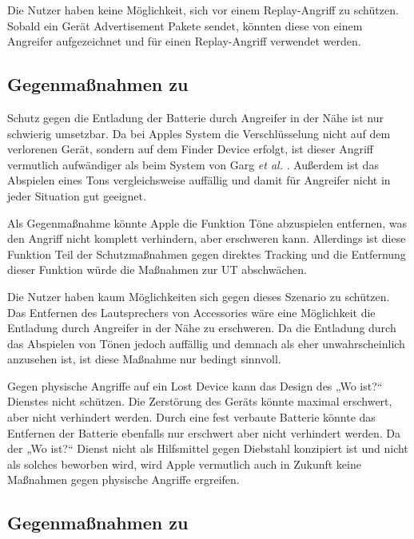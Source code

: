 Die Nutzer haben keine Möglichkeit, sich vor einem Replay-Angriff zu schützen.
Sobald ein Gerät Advertisement Pakete sendet, könnten diese von einem Angreifer aufgezeichnet und für einen Replay-Angriff verwendet werden.


\subsection{Gegenmaßnahmen zu }

Schutz gegen die Entladung der Batterie durch Angreifer in der Nähe ist nur schwierig umsetzbar.
Da bei Apples System die Verschlüsselung nicht auf dem verlorenen Gerät, sondern auf dem Finder Device erfolgt, ist dieser Angriff vermutlich aufwändiger als beim System von Garg \textit{et al.} \cite{Garg_Secure_Tracker}.
Außerdem ist das Abspielen eines Tons vergleichsweise auffällig und damit für Angreifer nicht in jeder Situation gut geeignet.

Als Gegenmaßnahme könnte Apple die Funktion Töne abzuspielen entfernen, was den Angriff nicht komplett verhindern, aber erschweren kann.
Allerdings ist diese Funktion Teil der Schutzmaßnahmen gegen direktes Tracking und die Entfernung dieser Funktion würde die Maßnahmen zur \ac{UT} abschwächen.

Die Nutzer haben kaum Möglichkeiten sich gegen dieses Szenario zu schützen. 
Das Entfernen des Lautsprechers von Accessories wäre eine Möglichkeit die Entladung durch Angreifer in der Nähe zu erschweren.
Da die Entladung durch das Abspielen von Tönen jedoch auffällig und demnach als eher unwahrscheinlich anzusehen ist, ist diese Maßnahme nur bedingt sinnvoll.

Gegen physische Angriffe auf ein Lost Device kann das Design des „Wo ist?“ Dienstes nicht schützen.
Die Zerstörung des Geräts könnte maximal erschwert, aber nicht verhindert werden.
Durch eine fest verbaute Batterie könnte das Entfernen der Batterie ebenfalls nur erschwert aber nicht verhindert werden.
Da der „Wo ist?“ Dienst nicht als Hilfsmittel gegen Diebstahl konzipiert ist und nicht als solches beworben \cite{Apple_WoIst} wird, wird Apple vermutlich auch in Zukunft keine Maßnahmen gegen physische Angriffe ergreifen.


\subsection{Gegenmaßnahmen zu }

